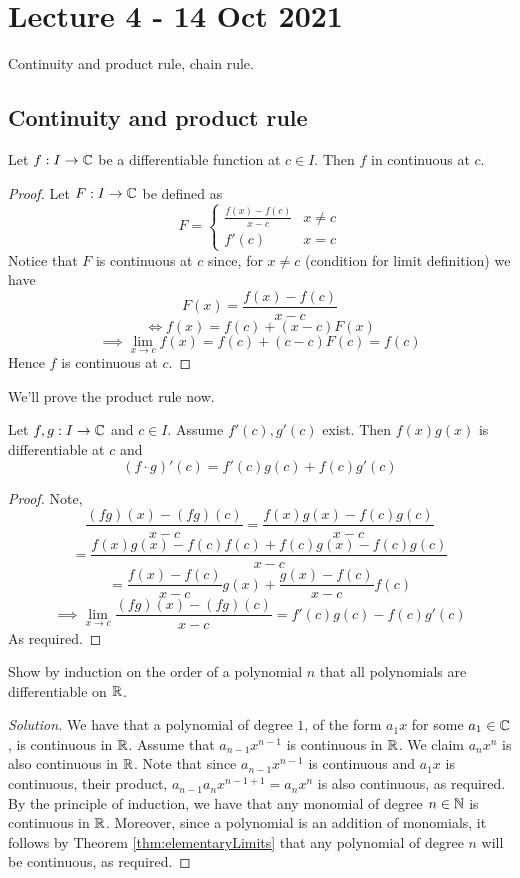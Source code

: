 \section{Lecture 4 - 14 Oct 2021}
Continuity and product rule, chain rule.
\subsection{Continuity and product rule}
\begin{proposition}
  Let $f:I\to\mathbb C$ be a differentiable function at $c\in I$. Then $f$ in continuous at $c$.
  \label{prop:trivialDiff}
\end{proposition}
\begin{proof}
  Let $F:I\to\mathbb C$ be defined as 
  \[F=
    \begin{cases}
      \frac{f(x)-f(c)}{x-c} & x\neq c \\
      f'(c) & x=c
    \end{cases}\]
    Notice that $F$ is continuous at $c$ since, for $x\neq c$ (condition for limit
    definition) we have
    \[F(x)=\frac{f(x)-f(c)}{x-c}\]
    \[\iff f(x)=f(c)+(x-c)F(x)\]
    \[\implies \lim_{x\to c}f(x)= f(c)+ (c-c)F(c)=f(c)\]
    Hence $f$ is continuous at $c$.
\end{proof}

We'll prove the product rule now.
\begin{proposition}
  Let $f,g:I\to\mathbb C$ and $c\in I$. Assume $f'(c),g'(c)$ exist. Then $f(x)g(x)$ is
  differentiable at $c$ and 
  \[(f\cdot g)'(c)= f'(c)g(c) + f(c)g'(c)\]
  \label{prop:productRule}
\end{proposition}
\begin{proof}
  Note,
  \[\frac{(fg)(x)-(fg)(c)}{x-c} = \frac{f(x)g(x) - f(c)g(c)}{x-c}\]
  \[=\frac{f(x)g(x)-f(c)f(c) + f(c)g(x)-f(c)g(c)}{x-c}\]
  \[=\frac{f(x)-f(c)}{x-c}g(x) + \frac{g(x)-f(c)}{x-c}f(c)\]
  \[\implies \lim_{x\to c}\frac{(fg)(x)-(fg)(c)}{x-c}=f'(c)g(c)-f(c)g'(c) \]
  As required.
\end{proof}

\begin{exercise}
  Show by induction on the order of a polynomial $n$ that all polynomials are
  differentiable on $\mathbb R$.
\end{exercise}
\begin{proof}[Solution]
  We have that a polynomial of degree $1$, of the form $a_1x$ for some $a_1\in\mathbb C$, is
  continuous in $\mathbb R$. Assume that $a_{n-1}x^{n-1}$ is continuous in $\mathbb R$. We claim
  $a_nx^n$ is also continuous in $\mathbb R$. Note that since $a_{n-1}x^{n-1}$ is continuous and
  $a_1x$ is continuous, their product, $a_{n-1}a_n x^{n-1+1}=a_nx^n$ is also continuous,
  as required. By the principle of induction, we have that any monomial of degree
  $n\in\mathbb N$ is continuous in $\mathbb R$. Moreover, since a polynomial is an addition of
  monomials, it follows by Theorem \ref{thm:elementaryLimits} that any polynomial of
  degree $n$ will be continuous, as required.
\end{proof}

